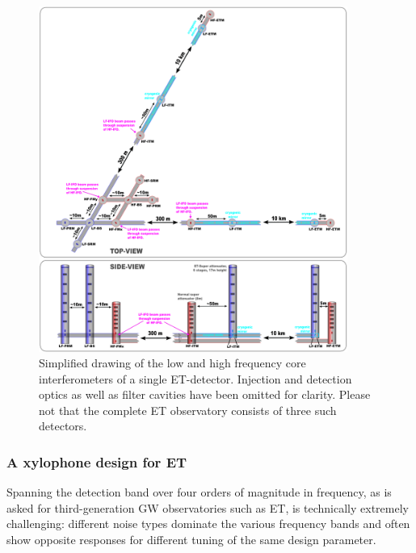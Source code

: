 \begin{figure}[p]
\centering
\includegraphics[width=0.9\textwidth]{Detector/Optics/OpticalLayout/OpticalLayoutFigures/ET_April2011_v2.png}
\caption{ Simplified drawing of the low and high frequency core interferometers of a single ET-detector. Injection and detection optics as well as filter cavities have been omitted for clarity. Please not that the complete ET observatory consists of three such detectors.%
}
\label{Fig:Simple_ETv1}
\end{figure}

\subsubsection{A xylophone design for ET}\label{sec:xylophone} 
Spanning the detection band over four orders of magnitude in frequency, as is
asked for third-generation GW observatories such as ET, is technically extremely
challenging: different noise types dominate the various frequency bands and
often show opposite responses for different tuning of the same design parameter.

